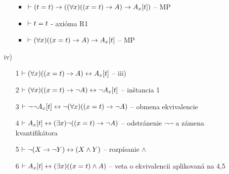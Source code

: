 \begin{dokaz}
\begin{itemize}
\begin{itemize}
\begin{itemize}
                \item $\vdash (t=t) \rightarrow ((\forall x) ((x=t)
                    \rightarrow A) \rightarrow A_x[t])$ -- MP

                \item $\vdash t=t$ - axióma R1

                \item $\vdash (\forall x) ((x=t)
                    \rightarrow A) \rightarrow A_x[t]$ -- MP
                \end{itemize}
            \end{itemize}
        \item[iv)]
            \begin{itemize}
            \item[1] $\vdash (\forall x)((x=t) \rightarrow A)
                \leftrightarrow A_x[t]$ -- iii)
            \item[2] $\vdash (\forall x)((x=t) \rightarrow \neg A)
                \leftrightarrow \neg A_x[t]$ -- inštancia 1
            \item[3] $\vdash \neg \neg A_x[t] \leftrightarrow
                \neg (\forall x) ((x=t) \rightarrow \neg A)$ -- obmena
                ekvivalencie
            \item[4] $\vdash A_x[t] \leftrightarrow (\exists x) \neg
                ((x=t) \rightarrow \neg A)$ -- odstránenie $\neg \neg$ a
                zámena kvantifikátora
            \item[5] $\vdash \neg(X \rightarrow \neg Y)
                \leftrightarrow  (X \land Y)$ -- rozpísanie
                $\land$
            \item[6] $\vdash A_x[t] \leftrightarrow (\exists x)
                ((x=t) \land A)$ -- veta o ekvivalencii aplikovaná na
                4,5

            \end{itemize}
    \end{itemize}
\end{dokaz}

